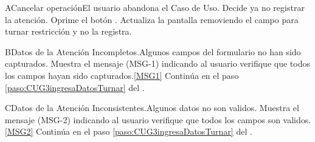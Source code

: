 	\begin{UCtrayectoriaA}{A}{Cancelar operación}{El usuario abandona el Caso de Uso.}
			\UCpaso[\UCactor] Decide ya no registrar la atención.
			\UCpaso[\UCactor] Oprime el botón .
			\UCpaso Actualiza la pantalla removiendo el campo para turnar restricción y no la registra. 
	\end{UCtrayectoriaA}

	\begin{UCtrayectoriaA}{B}{Datos de la Atención Incompletos.}{Algunos campos del formulario no han sido capturados.}
			\UCpaso Muestra el mensaje (MSG-1) indicando al usuario verifique que todos los campos hayan sido capturados.\ref{MSG1}
			\UCpaso Continúa en el paso \ref{paso:CUG3ingresaDatosTurnar} del .
	\end{UCtrayectoriaA}

	\begin{UCtrayectoriaA}{C}{Datos de la Atención Inconsistentes.}{Algunos datos no son validos.}
			\UCpaso Muestra el mensaje (MSG-2) indicando al usuario verifique que todos los campos son validos.\ref{MSG2}
			\UCpaso Continúa en el paso \ref{paso:CUG3ingresaDatosTurnar} del .
	\end{UCtrayectoriaA}